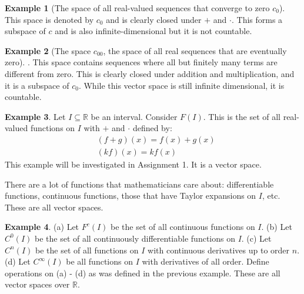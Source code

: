 \documentclass[11pt]{scrartcl}
\newcommand{\R}[0]{\mathbb{R}}
\theoremstyle{definition}
\newtheorem{ex}{Example}
\theoremstyle{remark}
\begin{document}
\begin{ex}[The space of all real-valued sequences that converge to zero $c_0$]
	This space is denoted by $c_0$ and is clearly closed under $+$ and $\cdot$. This forms a subspace of $c$ and is also infinite-dimensional but it is not countable. 
\end{ex}

\begin{ex}[The space $c_{00}$, the space of all real sequences that are eventually zero]. This space contains sequences where all but finitely many terms are different from zero. This is clearly closed under addition and multiplication, and it is a subspace of $c_0$. While this vector space is still infinite dimensional, it is countable. 
\end{ex}

\begin{ex} 
Let $I \subseteq \R$ be an interval. Consider $F(I)$. This is the set of all real-valued functions on $I$ with $+$ and $\cdot $ defined by: 
\begin{align*}
	& (f+g)(x) = f(x) + g(x) \\
	& (kf) (x) = kf(x)	
\end{align*}
	This example will be investigated in Assignment 1. It is a vector space. 
\end{ex}

There are a lot of functions that mathematicians care about: differentiable functions, continuous functions, those that have Taylor expansions on $I$, etc. These are all vector spaces. 

\begin{ex} 
(a) Let $F^c(I)$ be the set of all continuous functions on $I$. 	(b) Let $C^0(I)$ be the set of all continuously differentiable functions on $I$. (c) Let $C^n(I)$ be the set of all functions on $I$ with continuous derivatives up to order $n$. (d) Let $C^\infty (I)$ be all functions on $I$ with derivatives of all order. Define operations on (a) - (d) as was defined in the previous example. These are all vector spaces over $\R$. 
\end{ex}
\end{document}
